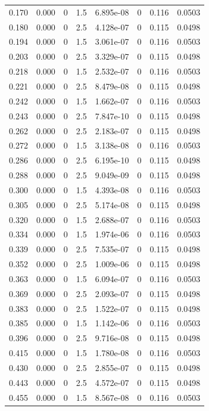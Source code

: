 \documentclass[preview]{standalone}
\begin{document}
{{\begin{tabular}{L{1.2cm}C{1.2cm} C{0.3cm}C{0.5cm} C{1.4cm}C{1.4cm} C{1.4cm}C{1.4cm}}
  0.170  &  0.000  & 0     & 1.5 &  6.895e-08  & 0  & 0.116 &  0.0503   \\ 
  0.180  &  0.000  & 0     & 2.5 &  4.128e-07  & 0  & 0.115 &  0.0498   \\ 
  0.194  &  0.000  & 0     & 1.5 &  3.061e-07  & 0  & 0.116 &  0.0503   \\ 
  0.203  &  0.000  & 0     & 2.5 &  3.329e-07  & 0  & 0.115 &  0.0498   \\ 
  0.218  &  0.000  & 0     & 1.5 &  2.532e-07  & 0  & 0.116 &  0.0503   \\ 
  0.221  &  0.000  & 0     & 2.5 &  8.479e-08  & 0  & 0.115 &  0.0498   \\ 
  0.242  &  0.000  & 0     & 1.5 &  1.662e-07  & 0  & 0.116 &  0.0503   \\ 
  0.243  &  0.000  & 0     & 2.5 &  7.847e-10  & 0  & 0.115 &  0.0498   \\ 
  0.262  &  0.000  & 0     & 2.5 &  2.183e-07  & 0  & 0.115 &  0.0498   \\ 
  0.272  &  0.000  & 0     & 1.5 &  3.138e-08  & 0  & 0.116 &  0.0503   \\ 
  0.286  &  0.000  & 0     & 2.5 &  6.195e-10  & 0  & 0.115 &  0.0498   \\ 
  0.288  &  0.000  & 0     & 2.5 &  9.049e-09  & 0  & 0.115 &  0.0498   \\ 
  0.300  &  0.000  & 0     & 1.5 &  4.393e-08  & 0  & 0.116 &  0.0503   \\ 
  0.305  &  0.000  & 0     & 2.5 &  5.174e-08  & 0  & 0.115 &  0.0498   \\ 
  0.320  &  0.000  & 0     & 1.5 &  2.688e-07  & 0  & 0.116 &  0.0503   \\ 
  0.334  &  0.000  & 0     & 1.5 &  1.974e-06  & 0  & 0.116 &  0.0503   \\ 
  0.339  &  0.000  & 0     & 2.5 &  7.535e-07  & 0  & 0.115 &  0.0498   \\ 
  0.352  &  0.000  & 0     & 2.5 &  1.009e-06  & 0  & 0.115 &  0.0498   \\ 
  0.363  &  0.000  & 0     & 1.5 &  6.094e-07  & 0  & 0.116 &  0.0503   \\ 
  0.369  &  0.000  & 0     & 2.5 &  2.093e-07  & 0  & 0.115 &  0.0498   \\ 
  0.383  &  0.000  & 0     & 2.5 &  1.522e-07  & 0  & 0.115 &  0.0498   \\ 
  0.385  &  0.000  & 0     & 1.5 &  1.142e-06  & 0  & 0.116 &  0.0503   \\ 
  0.396  &  0.000  & 0     & 2.5 &  9.716e-08  & 0  & 0.115 &  0.0498   \\ 
  0.415  &  0.000  & 0     & 1.5 &  1.780e-08  & 0  & 0.116 &  0.0503   \\ 
  0.430  &  0.000  & 0     & 2.5 &  2.855e-07  & 0  & 0.115 &  0.0498   \\ 
  0.443  &  0.000  & 0     & 2.5 &  4.572e-07  & 0  & 0.115 &  0.0498   \\ 
  0.455  &  0.000  & 0     & 1.5 &  8.567e-08  & 0  & 0.116 &  0.0503   \\ 
\hline 
\end{tabular} 

}}
\end{document}
